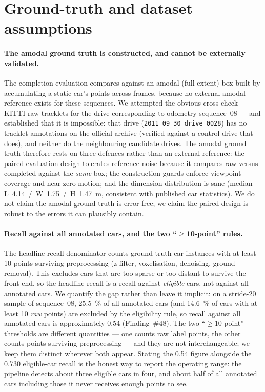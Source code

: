 \section{Ground-truth and dataset assumptions}
\label{sec:disc-gt}

\paragraph{The amodal ground truth is constructed, and cannot be externally validated.}
The completion evaluation compares against an amodal (full-extent) box built by
accumulating a static car's points across frames, because no external amodal reference
exists for these sequences. We attempted the obvious cross-check --- KITTI raw tracklets
for the drive corresponding to odometry sequence~08 --- and established that it is
impossible: that drive (\texttt{2011\_09\_30\_drive\_0028}) has no tracklet annotations on
the official archive (verified against a control drive that does), and neither do the
neighbouring candidate drives. The amodal ground truth therefore rests on three defences
rather than an external reference: the paired evaluation design tolerates reference noise
because it compares raw versus completed against the \emph{same} box; the construction
guards enforce viewpoint coverage and near-zero motion; and the dimension distribution is
sane (median L~\num{4.14}~/~W~\num{1.75}~/~H~\num{1.47}~\si{\metre}, consistent with
published car statistics). We do not claim the amodal ground truth is error-free; we claim
the paired design is robust to the errors it can plausibly contain.

\paragraph{Recall against all annotated cars, and the two ``$\geq$10-point'' rules.}
The headline recall denominator counts ground-truth car instances with at least \num{10}
points surviving preprocessing (z-filter, voxelisation, denoising, ground removal). This
excludes cars that are too sparse or too distant to survive the front end, so the headline
recall is a recall against \emph{eligible} cars, not against all annotated cars. We
quantify the gap rather than leave it implicit: on a stride-20 sample of sequence~08,
\SI{25.5}{\percent} of all annotated cars (and \SI{14.6}{\percent} of cars with at least
\num{10} \emph{raw} points) are excluded by the eligibility rule, so recall against all
annotated cars is approximately \num{0.54} (Finding~\#48). The two ``$\geq$10-point''
thresholds are different quantities --- one counts raw label points, the other counts
points surviving preprocessing --- and they are not interchangeable; we keep them
distinct wherever both appear. Stating the \num{0.54} figure alongside the \num{0.730}
eligible-car recall is the honest way to report the operating range: the pipeline detects
about three eligible cars in four, and about half of all annotated cars including those it
never receives enough points to see.

